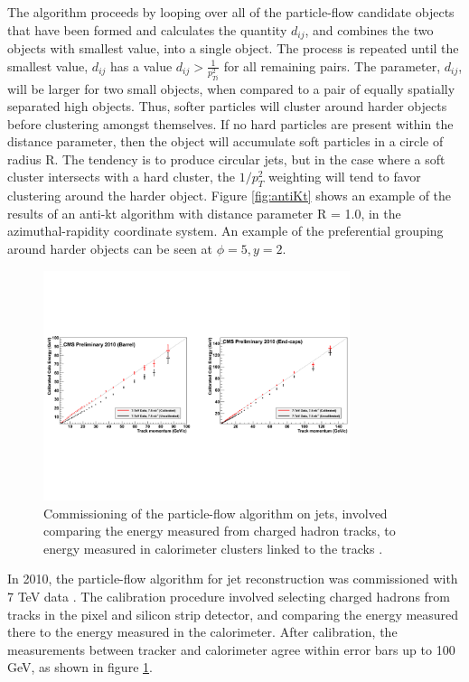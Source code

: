 \par The algorithm proceeds by looping over all of the particle-flow
candidate objects that have been formed and calculates the quantity
$d_{ij}$, and combines the two objects with smallest value, into a
single object.  The process is repeated until the smallest value,
$d_{ij}$ has a value $d_{ij} > \frac{1}{p_{Ti}^{2}}$ for all remaining
pairs.  The parameter, $d_{ij}$, will be larger for two small \PT
objects, when compared to a pair of equally spatially separated high
\PT objects.  Thus, softer particles will cluster around harder
objects before clustering amongst themselves.  If no hard particles are
present within the distance parameter, then the object will
accumulate soft particles in a circle of radius R.  The tendency is to
produce circular jets, but in the case where a soft \PT cluster intersects
with a hard \PT cluster, the $1/p_{T}^{2}$ weighting will tend
to favor clustering around the harder \PT object.  Figure
\ref{fig:antiKt} shows an example of the results of an anti-kt
algorithm with distance parameter R = 1.0, in the azimuthal-rapidity
coordinate system.  An example of the preferential grouping around
harder \PT objects can be seen at $\phi=5, y=2$.  

\begin{figure}[h]
   \centering
  \includegraphics[width=0.8\textwidth]{Figures/Reconstruction_Diagrams/Jets__PFChargedHadronCalibration.pdf}
  \caption{Commissioning of the particle-flow algorithm on jets,
    involved comparing the energy measured from charged hadron tracks,
  to energy measured in calorimeter clusters linked to the tracks
  \cite{CMS-PAS-PFT-10-002}. } \label{fig:chargedHadron_calib}
\end{figure}

\par In 2010, the particle-flow algorithm for jet reconstruction was
commissioned with 7 TeV data \cite{CMS-PAS-PFT-10-002}.  The
calibration procedure involved selecting charged hadrons from tracks
in the pixel and silicon strip detector, and comparing the energy
measured there to the energy measured in the calorimeter.  After
calibration, the measurements between tracker and calorimeter agree
within error bars up to 100 GeV, as shown in figure
\ref{fig:chargedHadron_calib}. 

